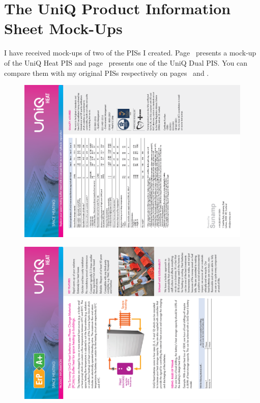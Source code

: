 
\chapter{The UniQ Product Information Sheet Mock-Ups} %

\label{App:mockups} %


I have received mock-ups of two of the PISs I created.
Page~\pageref{app:heat_mockup} presents a mock-up of the UniQ Heat PIS and page~\pageref{app:dual_mockup} presents one of the UniQ Dual PIS.
You can compare them with my original PISs respectively on pages~\pageref{app:heatPIS} and \pageref{app:dualPIS}.


\newpage
\begin{figure}
	\centering
	\includegraphics[height=0.48\textheight]{Appendices/UniQ_Heat_02.PNG}
	\label{app:heat_mockup}
\end{figure}

\begin{figure}
	\centering
	\includegraphics[height=0.48\textheight]{Appendices/UniQ_Heat_01.PNG}
\end{figure}


